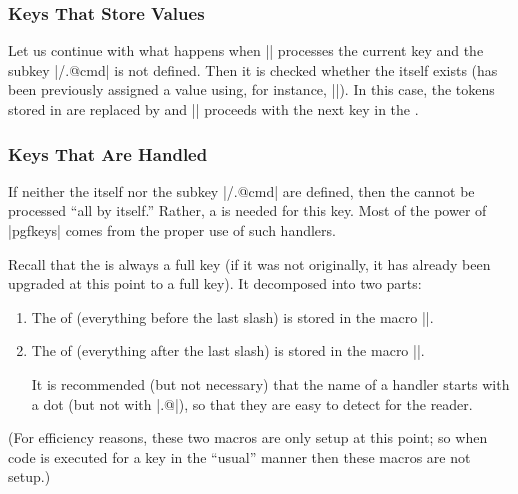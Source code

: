 

\subsubsection{Keys That Store Values}

Let us continue with what happens when |\pgfkeys| processes the
current key and  the subkey |/.@cmd| is not defined. Then
it is checked whether the  itself exists (has been
previously assigned a value using, for instance,
|\pgfkeyssetvalue|). In this case, the tokens stored in  are
replaced by  and |\pgfkeys| proceeds with the next key in
the . 


\subsubsection{Keys That Are Handled}
\label{section-key-handlers}

If neither the  itself nor the subkey |/.@cmd| are
defined, then the  cannot be processed ``all by itself.''
Rather, a  is needed for this key. Most of the power of
|pgfkeys| comes from the proper use of such handlers.

Recall that the  is always a full key (if it was not
originally, it has already been upgraded at this point to a full
key). It decomposed into  two parts:

\begin{enumerate}
\item The  of  (everything
  before the last slash) is stored in the macro |\pgfkeyscurrentpath|.
\item The  of  (everything
  after the last slash) is stored in the macro |\pgfkeyscurrentname|.

  It is recommended (but not necessary) that the name of a handler
  starts with a dot (but not with |.@|), so that they are easy to
  detect for the reader.  
\end{enumerate}

(For efficiency reasons, these two macros are only setup at this point;
so when code is executed for a key in the ``usual'' manner then these
macros are not setup.)


